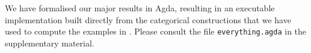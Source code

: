 We have formalised our major results in Agda, resulting in an executable implementation built directly from the categorical constructions that we have used to compute the examples in . Please consult the file \texttt{everything.agda} in the supplementary material.



